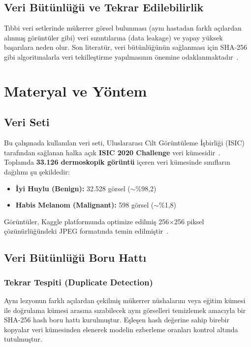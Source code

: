 \documentclass[12pt,a4paper]{article}
\begin{document}
\subsection{Veri Bütünlüğü ve Tekrar Edilebilirlik}
Tıbbi veri setlerinde mükerrer görsel bulunması (aynı hastadan farklı açılardan alınmış görüntüler gibi) veri sızıntılarına (data leakage) ve yapay yüksek başarılara neden olur. Son literatür, veri bütünlüğünün sağlanması için SHA-256 gibi algoritmalarla veri tekilleştirme yapılmasının önemine odaklanmaktadır~\cite{rotemberg2021}.

\section{Materyal ve Yöntem}
\label{sec:materyal_yontem}

\subsection{Veri Seti}
Bu çalışmada kullanılan veri seti, Uluslararası Cilt Görüntüleme İşbirliği (ISIC) tarafından sağlanan halka açık \textbf{ISIC 2020 Challenge} veri kümesidir~\cite{rotemberg2021}. Toplamda \textbf{33.126 dermoskopik görüntü} içeren veri kümesinde sınıfların dağılımı şu şekildedir:
\begin{itemize}
    \item \textbf{İyi Huylu (Benign):} 32.528 görsel ($\sim$\%98,2)
    \item \textbf{Habis Melanom (Malignant):} 598 görsel ($\sim$\%1,8)
\end{itemize}
Görüntüler, Kaggle platformunda optimize edilmiş 256$\times$256 piksel çözünürlüğündeki JPEG formatında temin edilmiştir~\cite{kaggle2020}.

\subsection{Veri Bütünlüğü Boru Hattı}

\subsubsection{Tekrar Tespiti (Duplicate Detection)}
Aynı lezyonun farklı açılardan çekilmiş mükerrer nüshalarını veya eğitim kümesi ile doğrulama kümesi arasına sızabilecek aynı görselleri temizlemek amacıyla bir SHA-256 hash boru hattı kurulmuştur. Eşleşen hash değerine sahip birebir kopyalar veri kümesinden elenerek modelin ezberleme oranları kontrol altında tutulmuştur.
\end{document}
